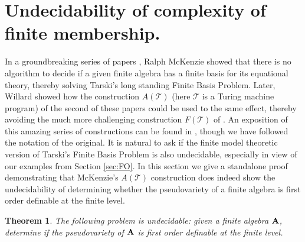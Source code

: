 \documentclass[reqno]{amsart}
\theoremstyle{plain}
\newtheorem{thm}{Theorem}[section]
\theoremstyle{definition}
\newcommand{\up}[1]{\textup{#1}}
\begin{document}
\section{Undecidability of complexity of finite membership.}\label{sec:undecid}
In a groundbreaking series of papers  \cite{mck1,mck2,mck3}, Ralph McKenzie showed that there is no algorithm to decide if a given finite algebra has a finite basis for its equational theory, thereby solving Tarski's long standing Finite Basis Problem.  Later, Willard \cite{wil} showed how the construction $A(\mathcal{T})$ (here $\mathcal{T}$ is a Turing machine program) of the second of these papers \cite{mck2} could be used to the same effect, thereby avoiding the much more challenging construction $F(\mathcal{T})$ of \cite{mck3}.  An exposition of this amazing series of constructions can be found in \cite[Sections 7.10 and 7.11]{ALV}, though we have followed the notation of the original. It is natural to ask if the finite model theoretic version of Tarski's Finite Basis Problem is also undecidable, especially in view of our examples from Section \ref{sec:FO}.  In this section we give a standalone proof demonstrating that McKenzie's $A(\mathcal{T})$ construction does indeed show the undecidability of determining whether the pseudovariety of a finite algebra is first order definable at the finite level.  
\begin{thm}
The following problem is undecidable\up: given a finite algebra ${\bf A}$, determine if the pseudovariety of ${\bf A}$ is first order definable at the finite level.
\end{thm}
\end{document}
